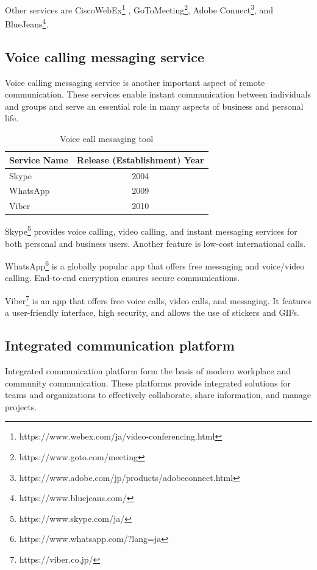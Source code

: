 \documentclass[12pt]{article}
\begin{document}
Other services are
CiscoWebEx\footnote{https://www.webex.com/ja/video-conferencing.html} ,
GoToMeeting\footnote{https://www.goto.com/meeting}, Adobe
Connect\footnote{https://www.adobe.com/jp/products/adobeconnect.html}, and
BlueJeans\footnote{https://www.bluejeans.com/}.

\subsection{Voice calling messaging service}
Voice calling messaging service is another important aspect of remote
communication. These services enable instant communication between individuals
and
groups and serve an essential role in many aspects of business and personal
life.

\begin{table}[h]
    \begin{center}
        \begin{tabular}{|l|c|} \hline
            Service Name & Release (Establishment) Year \\ \hline
            Skype        & 2004                         \\
            WhatsApp     & 2009                         \\
            Viber        & 2010                         \\ \hline
        \end{tabular}
        \caption{Voice call messaging tool}
    \end{center}
\end{table}

Skype\footnote{https://www.skype.com/ja/} provides voice calling, video
calling, and instant messaging services for
both personal and business users. Another feature is low-cost international
calls.

WhatsApp\footnote{https://www.whatsapp.com/?lang=ja} is a globally popular app
that offers free messaging and voice/video
calling. End-to-end encryption ensures secure communications.

Viber\footnote{https://viber.co.jp/} is an app that offers free voice calls,
video calls, and messaging. It
features a user-friendly interface, high security, and allows the use of
stickers and GIFs.

\subsection{Integrated communication platform}
Integrated communication platform form the basis of modern workplace and
community communication. These platforms provide integrated solutions for teams
and organizations to effectively collaborate, share information, and manage
projects.
\end{document}
